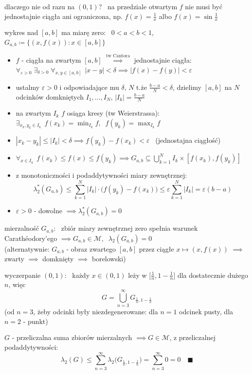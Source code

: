 \documentclass[a4paper,12pt]{article}
\begin{document}
\smallskip
dlaczego nie od razu na \((0, 1)\)? \, na przedziale otwartym \(f\) nie musi być jednostajnie ciągła ani ograniczona, np. \(f(x) = \frac{1}{x}\) albo \(f(x) = \sin \frac{1}{x}\)
\begin{steps}
    \item wykres nad \([a, b]\) ma miarę zero: \, \(0 < a < b < 1\), \; \(G_{a, b} \coloneqq \{(x, f(x)) : x \in [a, b]\}\)
    \begin{itemize}
        \item \(f\) - ciągła na zwartym \([a, b]\) \(\overset{\text{tw Cantora}}{\implies}\) jednostajnie ciągła: \, \(\forall_{\varepsilon > 0} \; \exists_{\delta > 0} \; \forall_{x, y \in [a, b]} \;\, |x - y| < \delta \implies |f(x) - f(y)| < \varepsilon\)
        \item ustalmy \(\varepsilon > 0\) i odpowiadające mu \(\delta\), \; \(N\) t.że \(\frac{b - a}{N} < \delta\), \; dzielimy \([a, b]\) na \(N\) odcinków domkniętych \(I_1, \dots, I_N\), \; \(|I_k| = \frac{b - a}{N}\)
        \item na zwartym \(I_k\) \(f\) osiąga kresy (tw Weierstrassa): \, \(\exists_{x_k, y_k \in I_k} \;\, f(x_k) = \min_{I_k} f, \;\; f(y_k) = \max_{I_k} f\)
        \item \(|x_k - y_k| \leq |I_k| < \delta \implies f(y_k) - f(x_k) < \varepsilon\) \, (jednostajna ciągłość)
        \item \(\forall_{x \in I_k} \;\, f(x_k) \leq f(x) \leq f(y_k) \implies G_{a, b} \subseteq \bigcup_{k=1}^{N} I_k \times [f(x_k), f(y_k)]\)
        \item z monotoniczności i podaddytywności miary zewnętrznej:
        \[
        \lambda_2^*(G_{a, b}) \leq \sum_{k=1}^{N} |I_k| \cdot \big(f(y_k) - f(x_k)\big) \leq \varepsilon \sum_{k=1}^{N} |I_k| = \varepsilon(b - a)
        \]
        \item \(\varepsilon > 0\) - dowolne \(\implies \lambda_2^*(G_{a, b}) = 0\)
    \end{itemize}
    \item mierzalność \(G_{a, b}\): \, zbiór miary zewnętrznej zero spełnia warunek Carathéodory'ego \(\implies G_{a, b} \in \mathcal{M}, \;\; \lambda_2(G_{a, b}) = 0\) \\
    (alternatywnie: \(G_{a, b}\) - obraz zwartego \([a, b]\) przez ciągłe \(x \mapsto (x, f(x))\) \(\implies\) zwarty \(\implies\) domknięty \(\implies\) borelowski)
    \item wyczerpanie \((0, 1)\): \, każdy \(x \in (0, 1)\) leży w \(\big[\frac{1}{n}, 1 - \frac{1}{n}\big]\) dla dostatecznie dużego \(n\), więc
    \[
    G = \bigcup_{n=3}^{\infty} G_{\frac{1}{n}, 1 - \frac{1}{n}}
    \]
    (od \(n = 3\), żeby odcinki były niezdegenerowane: dla \(n = 1\) odcinek pusty, dla \(n = 2\) - punkt)

    \smallskip
    \(G\) - przeliczalna suma zbiorów mierzalnych \(\implies G \in \mathcal{M}\), \; z przeliczalnej podaddytywności:
    \[
    \lambda_2(G) \leq \sum_{n=3}^{\infty} \lambda_2\big(G_{\frac{1}{n}, 1 - \frac{1}{n}}\big) = \sum_{n=3}^{\infty} 0 = 0 \quad \blacksquare
    \]
\end{steps}
\end{document}
